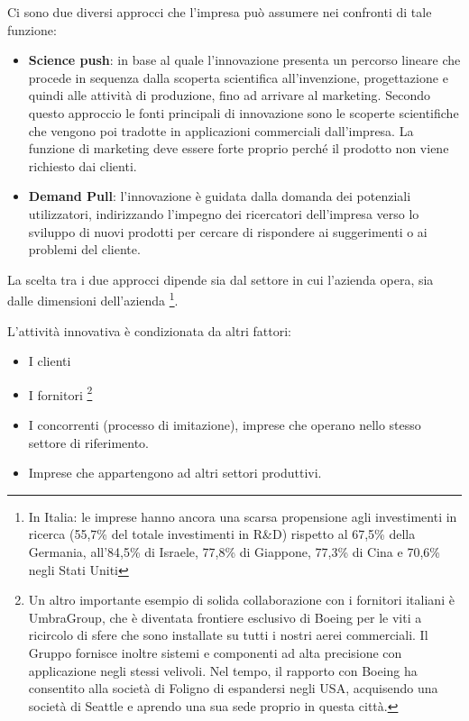 \documentclass{article}
\begin{document}
Ci sono due diversi approcci che l’impresa può assumere nei confronti di tale funzione:
\begin{itemize}
\item  \textbf{Science push}: in base al quale l’innovazione presenta un percorso
lineare che procede in sequenza dalla scoperta scientifica all’invenzione,
progettazione e quindi alle attività di produzione, fino ad arrivare al marketing.
Secondo questo approccio le fonti principali di innovazione sono le scoperte
scientifiche che vengono poi tradotte in applicazioni commerciali dall’impresa. La
funzione di marketing deve essere forte proprio perché il prodotto non viene
richiesto dai clienti.
\item \textbf{Demand Pull}: l’innovazione è guidata dalla domanda dei potenziali
utilizzatori, indirizzando l’impegno dei ricercatori dell’impresa verso lo sviluppo di
nuovi prodotti per cercare di rispondere ai suggerimenti o ai problemi del cliente.
\end{itemize}
La scelta tra i due approcci dipende sia dal settore in cui l'azienda opera, sia dalle dimensioni dell'azienda \footnote{In   Italia:   le   imprese   hanno   ancora   una   scarsa   propensione   agli investimenti  in  ricerca  (55,7\%  del  totale  investimenti  in  R\&D)  rispetto  al 67,5\% della Germania, all’84,5\% di Israele, 77,8\% di Giappone, 77,3\% di Cina e 70,6\% negli Stati Uniti}.

L'attività innovativa è condizionata da altri fattori:
\begin{itemize}
	\item I clienti 
	\item I fornitori \footnote{Un altro importante esempio di solida collaborazione con i fornitori italiani è UmbraGroup, che è diventata frontiere esclusivo di Boeing per le viti a ricircolo di sfere che sono installate su tutti i nostri aerei commerciali. Il Gruppo fornisce inoltre sistemi e componenti ad alta precisione con applicazione negli stessi velivoli. Nel tempo, il rapporto con Boeing ha consentito alla società di Foligno di espandersi negli USA, acquisendo una società di Seattle e aprendo una sua sede proprio in questa città.			}
	\item I concorrenti (processo di imitazione), imprese che operano nello stesso settore di riferimento.
	\item Imprese che appartengono ad altri settori produttivi.	
\end{itemize}
\end{document}
